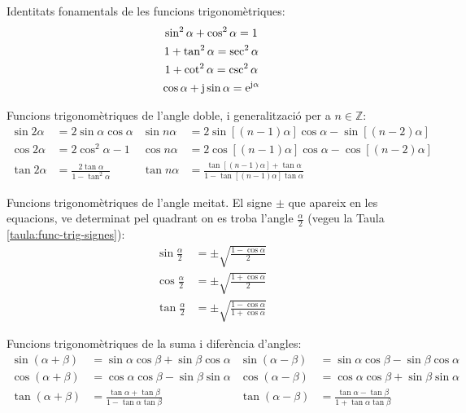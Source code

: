 Identitats fonamentals de les funcions trigonomètriques:
\begin{gather}
    \sin^2\alpha + \cos^2\alpha = 1 \\
    1 + \tan^2\alpha = \sec^2\alpha\\
    1 + \cot^2\alpha = \csc^2\alpha\\
    \cos\alpha + \mathrm{j} \sin\alpha = \mathrm{e}^{\mathrm{j}\alpha}
\end{gather}

Funcions trigonomètriques de l'angle doble, i generalització per a
$n\in\mathbb{Z}$:
\begin{subequations}
\begin{align}
    \sin 2\alpha &= 2 \sin\alpha \cos\alpha & \sin n \alpha &=
    2\sin[(n-1)\alpha]\cos \alpha -\sin[(n-2)\alpha]\\[1ex]
    \cos 2\alpha &= 2\cos^2\alpha -1 & \cos n\alpha &=
    2\cos[(n-1)\alpha]\cos \alpha -\cos[(n-2)\alpha]\\[1ex]
    \tan 2\alpha &=\frac{2\tan\alpha}{1-\tan^2\alpha} & \tan n
    \alpha &= \frac{\tan[(n-1)\alpha]+\tan\alpha}{1-\tan[(n-1)\alpha]\tan\alpha}
\end{align}
\end{subequations}


Funcions trigonomètriques de l'angle meitat. El signe $\pm$ que
apareix en les equacions, ve determinat pel quadrant on es troba
l'angle $\frac{\alpha}{2}$ (vegeu la Taula
\vref{taula:func-trig-signes}):
\begin{subequations}
\begin{align}
    \sin \frac{\alpha}{2} &= \pm \sqrt{\frac{1-\cos\alpha}{2}}\\[1ex]
    \cos \frac{\alpha}{2} &= \pm \sqrt{\frac{1+\cos\alpha}{2}}\\[1ex]
    \tan \frac{\alpha}{2} &= \pm \sqrt{\frac{1-\cos\alpha}{1+\cos\alpha}}
\end{align}
\end{subequations}


Funcions trigonomètriques de la suma i diferència d'angles:
\begin{subequations}
\begin{align}
    \sin(\alpha+\beta) &= \sin\alpha \cos\beta + \sin\beta\cos\alpha &
    \sin(\alpha-\beta) &= \sin\alpha \cos\beta - \sin\beta\cos\alpha\\[1ex]
    \cos(\alpha+\beta) &= \cos\alpha \cos\beta - \sin\beta\sin\alpha &
    \cos(\alpha-\beta) &= \cos\alpha \cos\beta + \sin\beta\sin\alpha\label{eq:D13b}\\[1ex]
    \tan(\alpha+\beta) &=\frac{\tan\alpha+\tan\beta}{1-\tan\alpha\tan\beta} &
    \tan(\alpha-\beta)
    &=\frac{\tan\alpha-\tan\beta}{1+\tan\alpha\tan\beta}
\end{align}
\end{subequations}

